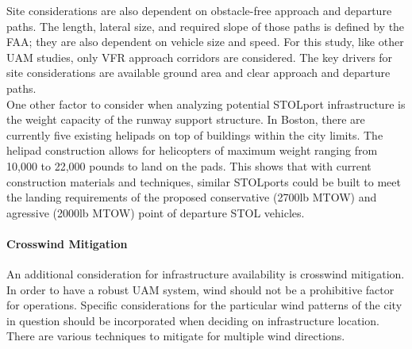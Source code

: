 \documentclass[]{aiaa-tc}%
\begin{document}
Site considerations are also dependent on obstacle-free approach and departure paths. The length, lateral size, and required slope of those paths is defined by the FAA\cite{AC150}; they are also dependent on vehicle size and speed\cite{AC150}. For this study, like other UAM studies\cite{Uber}, only VFR approach corridors are considered. The key drivers for site considerations are available ground area and clear approach and departure paths.\\

One other factor to consider when analyzing potential STOLport infrastructure is the weight capacity of the runway support structure. In Boston, there are currently five existing helipads on top of buildings within the city limits. The helipad construction allows for helicopters of maximum weight ranging from 10,000 to 22,000 pounds to land on the pads. This shows that with current construction materials and techniques, similar STOLports could be built to meet the landing requirements of the proposed conservative (2700lb MTOW) and agressive (2000lb MTOW) point of departure STOL vehicles.

\paragraph{Crosswind Mitigation}

An additional consideration for infrastructure availability is crosswind mitigation. In order to have a robust UAM system, wind should not be a prohibitive factor for operations. Specific considerations for the particular wind patterns of the city in question should be incorporated when deciding on infrastructure location. There are various techniques to mitigate for multiple wind directions. 
\end{document}
